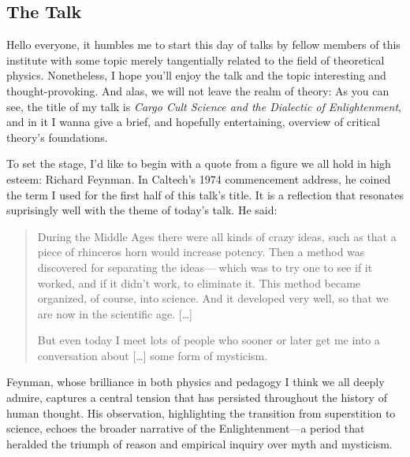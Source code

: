 \subsection*{The Talk}
Hello everyone, it humbles me to start this day of talks by fellow members of
this institute with some topic merely tangentially related to the field of
theoretical physics. Nonetheless, I hope you'll enjoy the talk and the topic interesting
and thought-provoking. 
And alas, we will not leave the realm of theory: As you
can see, the title of my talk is \emph{Cargo Cult Science and the Dialectic of
Enlightenment}, and in it I wanna give a brief, and hopefully entertaining,
overview of critical theory's foundations.

To set the stage, I’d like to begin with a quote from a figure we all hold in
high esteem: Richard Feynman. In Caltech’s 1974 commencement address, he coined
the term I used for the first half of this talk's title. It is
a reflection that resonates suprisingly well with the theme of today’s talk. He said:
\blockquote{
  During the Middle Ages there were all kinds of crazy ideas, such as that a
  piece of rhinceros horn would increase potency. Then a method was discovered
  for separating the ideas--- which was to try one to see if it worked, and if
  it didn't work, to eliminate it. This method became organized, of course,
  into science. And it developed very well, so that we are now in the
  scientific age. [\ldots]

  But even today I meet lots of people who sooner or later get me into a
  conversation about [\ldots] some form of mysticism.
}

Feynman, whose brilliance in both physics and pedagogy I think we all deeply admire,
captures a central tension that has persisted throughout the history of human
thought. His observation, highlighting the transition from superstition to
science, echoes the broader narrative of the Enlightenment---a period that
heralded the triumph of reason and empirical inquiry over myth and mysticism.


